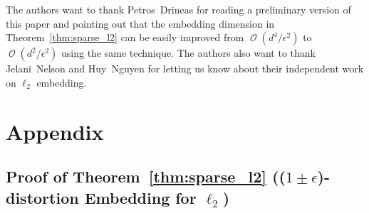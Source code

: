 \documentclass[11pt]{article}
\DeclareMathOperator{\bigO}{\mathcal{O}}
\begin{document}
The authors want to thank Petros~Drineas for reading a preliminary version of
this paper and pointing out that the embedding dimension in
Theorem~\ref{thm:sparse_l2} can be easily improved from $\bigO(d^4/\epsilon^2)$
to $\bigO(d^2/\epsilon^2)$ using the same technique.
The authors also want to thank Jelani~Nelson and Huy~Nguyen for letting us know
about their independent work on $\ell_2$ embedding.







\appendix
\section{Appendix}


\subsection{Proof of Theorem~\ref{thm:sparse_l2} (($1\pm\epsilon$)-distortion Embedding for $\ell_2$)}
\label{sec:proof_l2}
\end{document}
